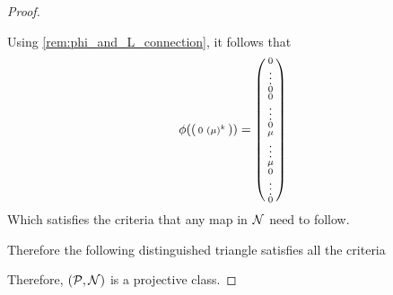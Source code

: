 \begin{proof}
\begin{enumerate}
{            Using \autoref{rem:phi_and_L_connection}, it follows that
            \[
                \phi(
                    \begin{psmallmatrix}
                        0 & ( \mu )^k
                    \end{psmallmatrix}
                    ) =
                \begin{psmallmatrix}
                    0 \\
                    \vdots \\
                    0 \\
                    0 \\
                    \vdots \\
                    0 \\
                    \mu \\
                    \vdots \\
                    \mu \\
                    0 \\
                    \vdots \\
                    0
                \end{psmallmatrix}
            \]
            Which satisfies the criteria that any map in \( {\mathcal{N}} \) need to follow.

            Therefore the following distinguished triangle satisfies all the criteria
            \begin{center}
            \end{center}
        }
    \end{enumerate}
    Therefore, \( ({\mathcal{P}}, {\mathcal{N}}) \) is a projective class.
\end{proof}

